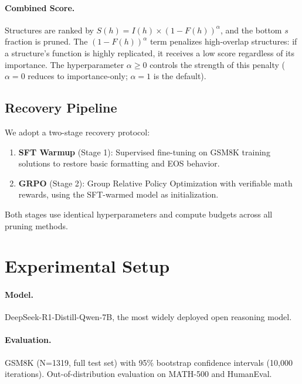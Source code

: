 \documentclass[11pt,a4paper]{article}
\newcommand{\score}{S(h)}
\newcommand{\importance}{I(h)}
\newcommand{\overlap}{F(h)}
\begin{document}
\paragraph{Combined Score.} Structures are ranked by $\score{} = \importance{} \times (1 - \overlap{})^\alpha$, and the bottom $s$ fraction is pruned. The $(1 - \overlap{})^\alpha$ term penalizes high-overlap structures: if a structure's function is highly replicated, it receives a low score regardless of its importance. The hyperparameter $\alpha \geq 0$ controls the strength of this penalty ($\alpha = 0$ reduces to importance-only; $\alpha = 1$ is the default).

\subsection{Recovery Pipeline}

We adopt a two-stage recovery protocol:
\begin{enumerate}
\item \textbf{SFT Warmup} (Stage 1): Supervised fine-tuning on GSM8K training solutions to restore basic formatting and EOS behavior.
\item \textbf{GRPO} (Stage 2): Group Relative Policy Optimization \cite{grpo2024} with verifiable math rewards, using the SFT-warmed model as initialization.
\end{enumerate}
Both stages use identical hyperparameters and compute budgets across all pruning methods.

\section{Experimental Setup}
\label{sec:setup}

\paragraph{Model.} DeepSeek-R1-Distill-Qwen-7B, the most widely deployed open reasoning model.

\paragraph{Evaluation.} GSM8K (N=1319, full test set) with 95\% bootstrap confidence intervals (10,000 iterations). Out-of-distribution evaluation on MATH-500 and HumanEval.
\end{document}
